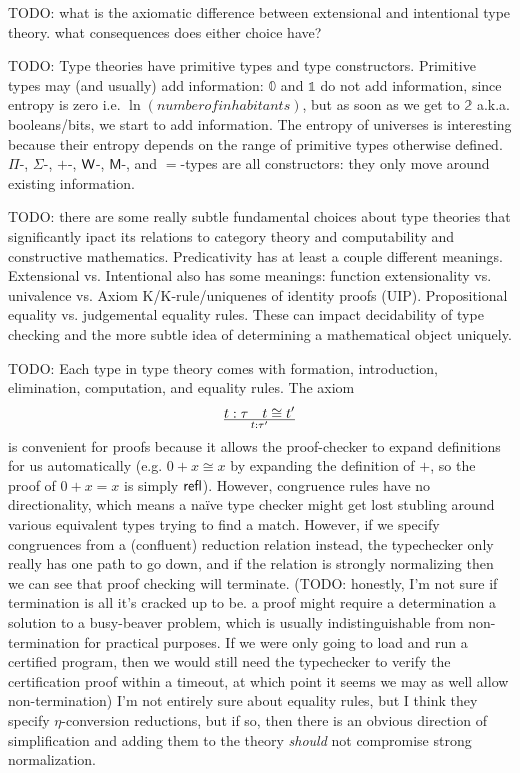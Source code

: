 \documentclass[11pt]{article} %
\theoremstyle{definition}
\theoremstyle{remark}
\begin{document}
TODO: what is the axiomatic difference between extensional and intentional type theory. what consequences does either choice have?


TODO:
Type theories have primitive types and type constructors.
Primitive types may (and usually) add information:
  $\mathbb 0$ and $\mathbb 1$ do not add information, since entropy is zero i.e. $\ln(number of inhabitants)$,
  but as soon as we get to $\mathbb 2$ a.k.a. booleans/bits, we start to add information.
The entropy of universes is interesting because their entropy depends on the range of primitive types otherwise defined.
$\Pi$-, $\Sigma$-, $+$-, $\mathsf{W}$-, $\mathsf M$-, and $=$-types are all constructors: they only move around existing information.

TODO: there are some really subtle fundamental choices about type theories that significantly ipact its relations to category theory and computability and constructive mathematics.
Predicativity has at least a couple different meanings. Extensional vs. Intentional also has some meanings: function extensionality vs. univalence vs. Axiom K/K-rule/uniquenes of identity proofs (UIP). Propositional equality vs. judgemental equality rules.
These can impact decidability of type checking and the more subtle idea of determining a mathematical object uniquely.


TODO:
Each type in type theory comes with formation, introduction, elimination, computation, and equality rules.
The axiom $$t : \tau \quad t \cong t' \over t : \tau'$$ is convenient for proofs because it allows the proof-checker to expand definitions for us automatically (e.g. $0 + x \cong x$ by expanding the definition of $+$, so the proof of $0 + x = x$ is simply $\mathsf{refl}$).
However, congruence rules have no directionality, which means a na\"ive type checker might get lost stubling around various equivalent types trying to find a match.
However, if we specify congruences from a (confluent) reduction relation instead, the typechecker only really has one path to go down, and if the relation is strongly normalizing then we can see that proof checking will terminate.
(TODO: honestly, I'm not sure if termination is all it's cracked up to be. a proof might require a determination a solution to a busy-beaver problem, which is usually indistinguishable from non-termination for practical purposes. If we were only going to load and run a certified program, then we would still need the typechecker to verify the certification proof within a timeout, at which point it seems we may as well allow non-termination)
I'm not entirely sure about equality rules, but I think they specify $\eta$-conversion reductions, but if so, then there is an obvious direction of simplification and adding them to the theory \emph{should} not compromise strong normalization.
\end{document}
